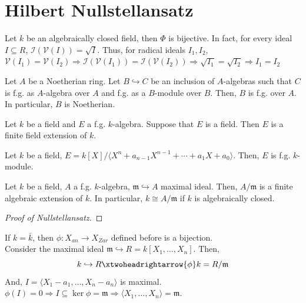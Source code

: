 \documentclass[oneside, 12pt]{scrbook}
\newcommand{\V}{\mathcal{V}}
\newcommand{\I}{\mathcal{I}}
\newcommand{\m}{\mathfrak{m}}
\theoremstyle{theorem}
\begin{document}
\section{Hilbert Nullstellansatz}

\begin{theorem}
Let $k$ be an algebraically closed field, then $\Phi$ is bijective. In fact, for every ideal $I \subseteq R$, $\I(\V(I)) = \sqrt{I}$. Thus, for radical ideals $I_{1},I_{2}$, $\V(I_{1}) = \V(I_{2}) \Rightarrow \I(\V(I_{1})) = \I(\V(I_{2})) \Rightarrow \sqrt{I_{1}} = \sqrt{I_{2}} \Rightarrow I_{1}=I_{2}$
\end{theorem}

\begin{lemma}
Let $A$ be a Noetherian ring. Let $B \hookrightarrow C$ be an inclusion of $A$-algebras such that $C$ is f.g. as $A$-algebra over $A$ and f.g. as a $B$-module over $B$. Then, $B$ is f.g. over $A$. In particular, $B$ is Noetherian.
\end{lemma}

\begin{lemma}
Let $k$ be a field and $E$ a f.g. $k$-algebra. Suppose that $E$ is a field. Then $E$ is a finite field extension of $k$.
\end{lemma}

\begin{lemma}
Let $k$ be a field, $E = k[X]/\langle X^n + a_{n-1}X^{n-1} + \cdots + a_{1}X + a_{0} \rangle$. Then, $E$ is f.g. $k$-module.
\end{lemma}

\begin{corollary}
Let $k$ be a field, $A$ a f.g. $k$-algebra, $\m \hookrightarrow A$ maximal ideal. Then, $A/\m$ is a finite algebraic extension of $k$. In particular, $k \cong A/\m$ if $k$ is algebraically closed.
\end{corollary}

\begin{proof}[Proof of Nullstellansatz]

\end{proof}

If $k = \bar{k}$, then $\phi : X_{an} \rightarrow X_{Zar}$ defined before is a bijection. \\

Consider the maximal ideal $\m \hookrightarrow R = k[X_{1}, \hdots , X_{n}]$. Then, $$k \hookrightarrow R \xtwoheadrightarrow{\phi} k = R/\m$$ And, $I = \langle X_{1}-a_{1}, \hdots , X_{n} - a_{n} \rangle$ is maximal. $\phi(I) = 0 \Rightarrow I \subseteq \ker \phi = \m \Rightarrow \langle X_{1}, \hdots ,X_{n} \rangle = \m$. 
\end{document}
